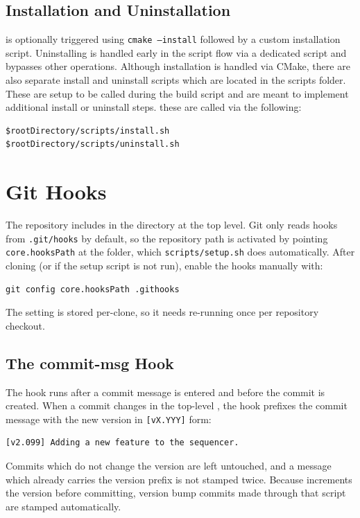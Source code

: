 \subsection{Installation and Uninstallation}

 is optionally triggered using \texttt{cmake --install} followed by a custom installation script. Uninstalling is handled early in the script flow via a dedicated script and bypasses other operations. Although installation is handled via CMake, there are also separate install and uninstall scripts which are located in the scripts folder. These are setup to be called during the build script and are meant to implement additional install or uninstall steps. these are called via the following:
\begin{lstlisting}[style=shellstyle]
$rootDirectory/scripts/install.sh
$rootDirectory/scripts/uninstall.sh
\end{lstlisting}







\section{Git Hooks}\label{section:git_hooks}

The repository includes  in the  directory at the top level. Git only reads hooks from \texttt{.git/hooks} by default, so the repository path is activated by pointing \texttt{core.hooksPath} at the folder, which \texttt{scripts/setup.sh} does automatically. After cloning (or if the setup script is not run), enable the hooks manually with:
\begin{lstlisting}[style=shellstyle]
git config core.hooksPath .githooks
\end{lstlisting}
The setting is stored per-clone, so it needs re-running once per repository checkout.

\subsection{The commit-msg Hook}

The  hook runs after a commit message is entered and before the commit is created. When a commit changes  in the top-level , the hook prefixes the commit message with the new version in \texttt{[vX.YYY]} form:
\begin{lstlisting}[style=terminalstyle]
[v2.099] Adding a new feature to the sequencer.
\end{lstlisting}
Commits which do not change the version are left untouched, and a message which already carries the version prefix is not stamped twice. Because  increments the version before committing, version bump commits made through that script are stamped automatically.

